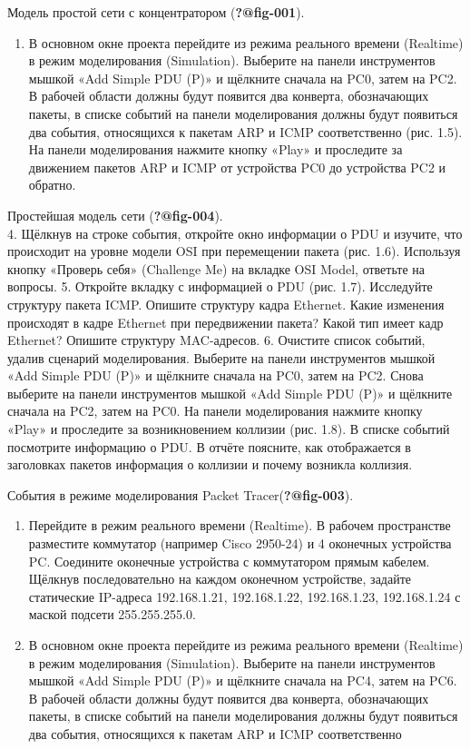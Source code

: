 \documentclass[
  english,
  russian,
  12pt,
  a4paper,
  DIV=11,
  numbers=noendperiod]{scrreprt}
\providecommand{\tightlist}{%
  \setlength{\itemsep}{0pt}\setlength{\parskip}{0pt}}
\begin{document}
Модель простой сети с концентратором (\textbf{?@fig-001}). \textbar{}

\begin{enumerate}
\def\labelenumi{\arabic{enumi}.}
\setcounter{enumi}{2}
\tightlist
\item
  В основном окне проекта перейдите из режима реального времени
  (Realtime) в режим моделирования (Simulation). Выберите на панели
  инструментов мышкой «Add Simple PDU (P)» и щёлкните сначала на PC0,
  затем на PC2. В рабочей области должны будут появится два конверта,
  обозначающих пакеты, в списке событий на панели моделирования должны
  будут появиться два события, относящихся к пакетам ARP и ICMP
  соответственно (рис. 1.5). На панели моделирования нажмите кнопку
  «Play» и проследите за движением пакетов ARP и ICMP от устройства PC0
  до устройства PC2 и обратно.
\end{enumerate}

Простейшая модель сети (\textbf{?@fig-004}).\\
4. Щёлкнув на строке события, откройте окно информации о PDU и изучите,
что происходит на уровне модели OSI при перемещении пакета (рис. 1.6).
Используя кнопку «Проверь себя» (Challenge Me) на вкладке OSI Model,
ответьте на вопросы. 5. Откройте вкладку с информацией о PDU (рис. 1.7).
Исследуйте структуру пакета ICMP. Опишите структуру кадра Ethernet.
Какие изменения происходят в кадре Ethernet при передвижении пакета?
Какой тип имеет кадр Ethernet? Опишите структуру MAC-адресов. 6.
Очистите список событий, удалив сценарий моделирования. Выберите на
панели инструментов мышкой «Add Simple PDU (P)» и щёлкните сначала на
PC0, затем на PC2. Снова выберите на панели инструментов мышкой «Add
Simple PDU (P)» и щёлкните сначала на PC2, затем на PC0. На панели
моделирования нажмите кнопку «Play» и проследите за возникновением
коллизии (рис. 1.8). В списке событий посмотрите информацию о PDU. В
отчёте поясните, как отображается в заголовках пакетов информация о
коллизии и почему возникла коллизия.

События в режиме моделирования Packet Tracer(\textbf{?@fig-003}).

\begin{enumerate}
\def\labelenumi{\arabic{enumi}.}
\setcounter{enumi}{6}
\tightlist
\item
  Перейдите в режим реального времени (Realtime). В рабочем пространстве
  разместите коммутатор (например Cisco 2950-24) и 4 оконечных
  устройства PC. Соедините оконечные устройства с коммутатором прямым
  кабелем. Щёлкнув последовательно на каждом оконечном устройстве,
  задайте статические IP-адреса 192.168.1.21, 192.168.1.22,
  192.168.1.23, 192.168.1.24 с маской подсети 255.255.255.0.
\item
  В основном окне проекта перейдите из режима реального времени
  (Realtime) в режим моделирования (Simulation). Выберите на панели
  инструментов мышкой «Add Simple PDU (P)» и щёлкните сначала на PC4,
  затем на PC6. В рабочей области должны будут появится два конверта,
  обозначающих пакеты, в списке событий на панели моделирования должны
  будут появиться два события, относящихся к пакетам ARP и ICMP
  соответственно
\end{enumerate}
\end{document}
